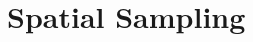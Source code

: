 \documentclass[preprint,11pt]{aastex}
\newcommand{\Reff}{{R$_{e}$}}
\begin{document}




\section{Spatial Sampling} \label{sec:spatial_sampling}
\end{document}
